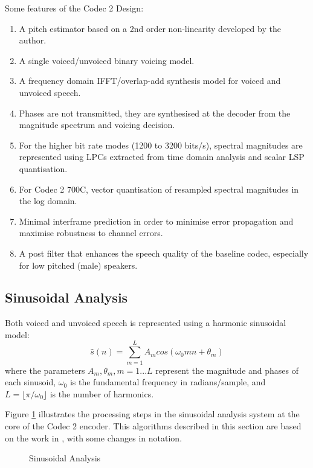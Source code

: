 \documentclass{article}
\begin{document}
{Some features of the Codec 2 Design:
\begin{enumerate}
\item A pitch estimator based on a 2nd order non-linearity developed by the author.
\item A single voiced/unvoiced binary voicing model.
\item A frequency domain IFFT/overlap-add synthesis model for voiced and unvoiced speech.
\item Phases are not transmitted, they are synthesised at the decoder from the magnitude spectrum and voicing decision.  
\item For the higher bit rate modes (1200 to 3200 bits/s), spectral magnitudes are represented using LPCs extracted from time domain analysis and scalar LSP quantisation.
\item For Codec 2 700C, vector quantisation of resampled spectral magnitudes in the log domain.
\item Minimal interframe prediction in order to minimise error propagation and maximise robustness to channel errors.
\item A post filter that enhances the speech quality of the baseline codec, especially for low pitched (male) speakers.
\end{enumerate}

\subsection{Sinusoidal Analysis}

Both voiced and unvoiced speech is represented using a harmonic sinusoidal model:
\begin{equation}
\hat{s}(n) = \sum_{m=1}^L A_m cos(\omega_0 m n + \theta_m)
\end{equation}
where the parameters $A_m, \theta_m, m=1...L$ represent the magnitude and phases of each sinusoid, $\omega_0$ is the fundamental frequency in radians/sample, and $L=\lfloor \pi/\omega_0 \rfloor$ is the number of harmonics.

Figure \ref{fig:analysis} illustrates the processing steps in the sinusoidal analysis system at the core of the Codec 2 encoder.  This algorithms described in this section are based on the work in \cite{rowe1997techniques}, with some changes in notation.

\begin{figure}[h]
\caption{Sinusoidal Analysis}
\label{fig:analysis}
\begin{center}
\begin{tikzpicture}[auto, node distance=2cm,>=triangle 45,x=1.0cm,y=1.0cm, align=center]


\end{tikzpicture}
\end{center}
\end{figure}}
\end{document}
